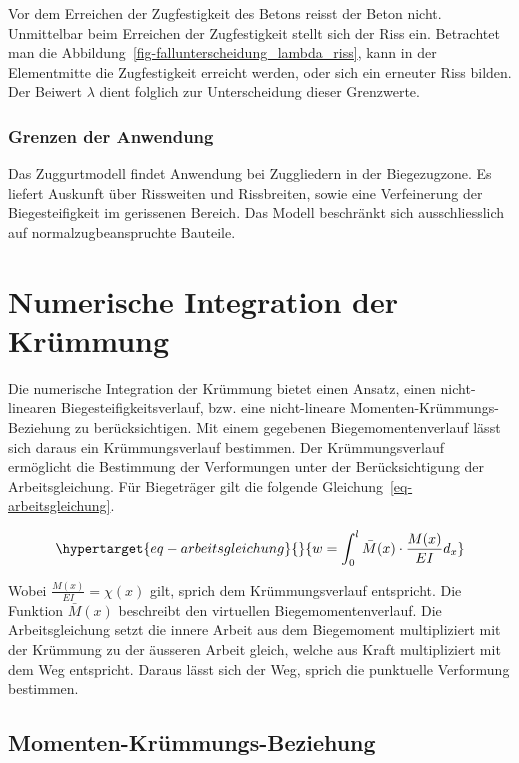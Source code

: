\documentclass[
  12pt,
  letterpaper,
  egregdoesnotlikesansseriftitles]{scrreprt}
\begin{document}
Vor dem Erreichen der Zugfestigkeit des Betons reisst der Beton nicht.
Unmittelbar beim Erreichen der Zugfestigkeit stellt sich der Riss ein.
Betrachtet man die Abbildung~\ref{fig-fallunterscheidung_lambda_riss},
kann in der Elementmitte die Zugfestigkeit erreicht werden, oder sich
ein erneuter Riss bilden. Der Beiwert \(\lambda\) dient folglich zur
Unterscheidung dieser Grenzwerte.

\hypertarget{grenzen-der-anwendung-1}{%
\subsubsection{Grenzen der Anwendung}\label{grenzen-der-anwendung-1}}

Das Zuggurtmodell findet Anwendung bei Zuggliedern in der Biegezugzone.
Es liefert Auskunft über Rissweiten und Rissbreiten, sowie eine
Verfeinerung der Biegesteifigkeit im gerissenen Bereich. Das Modell
beschränkt sich ausschliesslich auf normalzugbeanspruchte Bauteile.

\hypertarget{sec-numint}{%
\section{Numerische Integration der Krümmung}\label{sec-numint}}

Die numerische Integration der Krümmung bietet einen Ansatz, einen
nicht-linearen Biegesteifigkeitsverlauf, bzw. eine nicht-lineare
Momenten-Krümmungs-Beziehung zu berücksichtigen. Mit einem gegebenen
Biegemomentenverlauf lässt sich daraus ein Krümmungsverlauf bestimmen.
Der Krümmungsverlauf ermöglicht die Bestimmung der Verformungen unter
der Berücksichtigung der Arbeitsgleichung. Für Biegeträger gilt die
folgende Gleichung~\ref{eq-arbeitsgleichung}.

\begin{equation}\protect\hypertarget{eq-arbeitsgleichung}{}{
w = \int_0^l \bar{M}(x) \cdot \frac{M(x)}{EI} d_x
}\label{eq-arbeitsgleichung}\end{equation}

Wobei \(\frac{M(x)}{EI} = \chi(x)\) gilt, sprich dem Krümmungsverlauf
entspricht. Die Funktion \(\bar{M}(x)\) beschreibt den virtuellen
Biegemomentenverlauf. Die Arbeitsgleichung setzt die innere Arbeit aus
dem Biegemoment multipliziert mit der Krümmung zu der äusseren Arbeit
gleich, welche aus Kraft multipliziert mit dem Weg entspricht. Daraus
lässt sich der Weg, sprich die punktuelle Verformung bestimmen.

\hypertarget{momenten-kruxfcmmungs-beziehung}{%
\subsection{Momenten-Krümmungs-Beziehung}\label{momenten-kruxfcmmungs-beziehung}}
\end{document}
